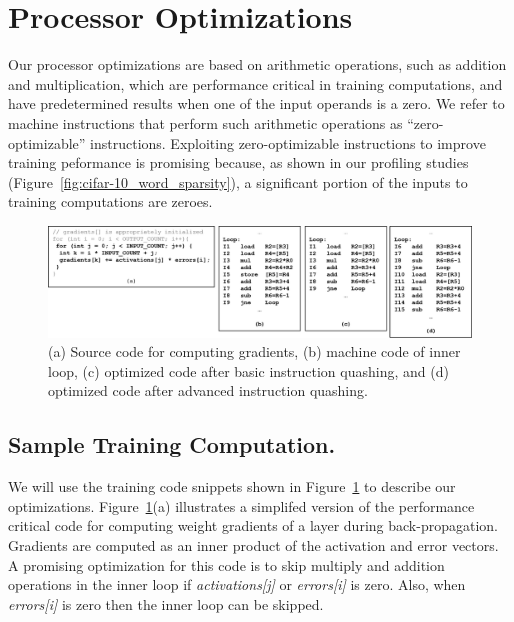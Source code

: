 \section{Processor Optimizations}
\label{sec:processor_opt}

Our processor optimizations are based on arithmetic operations, such as addition and multiplication, which are performance critical in training computations, and have predetermined results when one of the input operands is a zero. We refer to machine instructions that perform such arithmetic operations as ``zero-optimizable'' instructions. Exploiting zero-optimizable instructions to improve training peformance is promising because, as shown in our profiling studies (Figure~\ref{fig:cifar-10_word_sparsity}), a significant portion of the inputs to training computations are zeroes. 

\begin{figure}
\centering
\includegraphics[width=1.9\columnwidth]{Figures/gradient_code_opt.png}
\caption{(a) Source code for computing gradients, (b) machine code of inner loop, (c) optimized code after basic instruction quashing, and (d) optimized code after advanced instruction quashing.}
\label{fig:gradient_code_opt}
\end{figure}

\subsection{Sample Training Computation.}

We will use the training code snippets shown in Figure~\ref{fig:gradient_code_opt} to describe our optimizations.  Figure~\ref{fig:gradient_code_opt}(a) illustrates a simplifed version of the performance critical code for computing weight gradients of a layer during back-propagation. Gradients are computed as an inner product of the activation and error vectors. A promising optimization for this code is to skip multiply and addition operations in the inner loop if \emph{activations[j]} or \emph{errors[i]} is zero. Also, when \emph{errors[i]} is zero then the inner loop can be skipped. 

